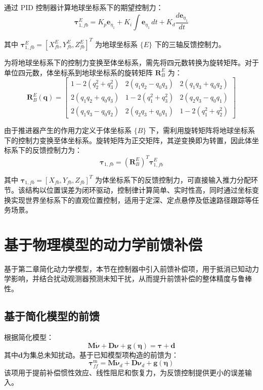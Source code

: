 通过 PID 控制器计算地球坐标系下的期望控制力：
\begin{equation}
\boldsymbol{\tau}_{1,fb}^{E} = K_p \boldsymbol{e}_{\eta_1}
+ K_i \int \boldsymbol{e}_{\eta_1}\,dt
+ K_d \frac{d\boldsymbol{e}_{\eta_1}}{dt}
\end{equation}

其中 $\boldsymbol{\tau}_{1,fb}^{E}=[X_{fb}^{E},Y_{fb}^{E},Z_{fb}^{E}]^T$ 为地球坐标系 $\{E\}$ 下的三轴反馈控制力。

为将地球坐标系下的控制力变换至体坐标系，需先将四元数转换为旋转矩阵。对于单位四元数，体坐标系到地球坐标系的旋转矩阵 $\boldsymbol{R}_B^E$ 为：
\begin{equation}
\boldsymbol{R}_B^E(\boldsymbol{q}) =
\begin{bmatrix}
1-2(q_2^2+q_3^2) & 2(q_1q_2-q_0q_3) & 2(q_1q_3+q_0q_2) \\[2pt]
2(q_1q_2+q_0q_3) & 1-2(q_1^2+q_3^2) & 2(q_2q_3-q_0q_1) \\[2pt]
2(q_1q_3-q_0q_2) & 2(q_2q_3+q_0q_1) & 1-2(q_1^2+q_2^2)
\end{bmatrix}
\end{equation}

由于推进器产生的作用力定义于体坐标系 $\{B\}$ 下，需利用旋转矩阵将地球坐标系下的控制力变换至体坐标系。旋转矩阵为正交矩阵，其逆变换即为转置，因此体坐标系下的反馈控制力为：
\begin{equation}
\boldsymbol{\tau}_{1,fb} = (\boldsymbol{R}_B^E)^T \boldsymbol{\tau}_{1,fb}^{E}
\end{equation}

其中 $\boldsymbol{\tau}_{1,fb}=[X_{fb},Y_{fb},Z_{fb}]^T$ 为体坐标系下的反馈控制力，可直接输入推力分配环节。该结构以位置误差为闭环驱动，控制律计算简单、实时性高，同时通过坐标变换实现世界坐标系下的直观位置控制，适用于定深、定点悬停及低速路径跟踪等任务场景。

\section{基于物理模型的动力学前馈补偿}

基于第二章简化动力学模型，本节在控制器中引入前馈补偿项，用于抵消已知动力学影响，并结合扰动观测器预测未知干扰，从而提升前馈补偿的整体精度与鲁棒性。

\subsection{基于简化模型的前馈}

根据简化模型：
\begin{equation}
\boldsymbol{M}\dot{\boldsymbol{\nu}} + \boldsymbol{D}\boldsymbol{\nu} + \boldsymbol{g}(\boldsymbol{\eta}) = \boldsymbol{\tau} + \boldsymbol{d}
\end{equation}
其中$\boldsymbol{d}$为集总未知扰动。基于已知模型项构造的前馈为：
\begin{equation}
\boldsymbol{\tau}_{ff}^{\mathrm{m}} =
\boldsymbol{M}\dot{\boldsymbol{\nu}}_d +
\boldsymbol{D}\boldsymbol{\nu}_d +
\boldsymbol{g}(\boldsymbol{\eta})
\end{equation}
该项用于提前补偿惯性效应、线性阻尼和恢复力，为反馈控制提供更小的误差输入。


